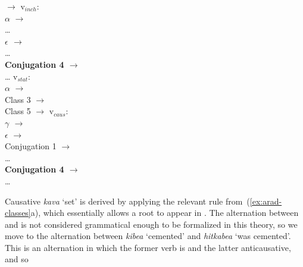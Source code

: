 \begin{exe}
\begin{xlist}
\begin{xlist}
\begin{exe}
\begin{xlist}
\begin{xlist}
\begin{exe}
\begin{xlist}
\begin{xlist}
\begin{exe}
\begin{exe}
\begin{xlist}
\begin{exe}
\begin{exe}
\begin{xlist}
\begin{exe}
\begin{exe}
\begin{exe}
\begin{exe}
\begin{exe}
\begin{xlist}
\begin{exe}
\begin{xlist}
\begin{exe}
\begin{exe}
\begin{xlist}
\begin{exe}
\begin{xlist}
\begin{exe}
\begin{exe}
\begin{exe}
\begin{xlist}
\begin{exe}
\begin{exe}
\begin{exe}
\begin{xlist}
\begin{exe}
\begin{xlist}
\begin{exe}
\begin{xlist}
\begin{exe}
\begin{xlist}
\begin{exe}
\begin{exe}
\begin{exe}
\begin{exe}
\begin{xlist}
\begin{exe}
\begin{xlist}
\begin{exe}
\begin{xlist}
\begin{exe}
\begin{xlist}
\begin{exe}
\begin{xlist}
\begin{exe}
\begin{xlist}
\begin{exe}
\begin{exe}
\begin{exe}
\begin{exe}
\begin{xlist}
\begin{exe}
\begin{xlist}
\begin{exe}
\begin{xlist}
\begin{exe}
\begin{exe}
\begin{xlist}
\begin{exe}
\begin{exe}
\begin{exe}
\begin{exe}
\begin{xlist}
\begin{xlist}
\begin{exe}
\begin{xlist}
\begin{exe}
\begin{exe}
\begin{exe}
\begin{xlist}
\begin{exe}
\begin{exe}
\begin{xlist}
\begin{exe}
\begin{exe}
\begin{exe}
\begin{xlist}
\begin{xlist}
\begin{exe}
\begin{xlist}
\begin{exe}
\begin{exe}
\begin{exe}
\begin{exe}
\begin{xlist}
\begin{exe}
\begin{xlist}
\begin{exe}
\begin{xlist}
\begin{exe}
\begin{exe}
\begin{exe}
\begin{exe}
\begin{exe}
\begin{exe}
\begin{xlist}
\begin{exe}
\begin{xlist}
\begin{exe}
\begin{xlist}
\begin{exe}
\begin{xlist}
\begin{exe}
\begin{xlist}
\begin{exe}
\begin{xlist}
\begin{exe}
\begin{xlist}
\begin{multicols}{2}
$\rightarrow$ {\thit}
 	\ex  v$_{inch}$: \\
			$ \alpha$ $\rightarrow$ {\tkal} \\
			\dots \\
			\textbf{$\epsilon$ $\rightarrow$ {\thit}}\\
			\dots \\
			\textbf{Conjugation 4 $\rightarrow$ {\thit}}\\
			\dots
		\columnbreak
 	\ex  v$_{stat}$: \\
			$ \alpha$ $\rightarrow$ {\tkal} \\
			Class 3 $\rightarrow$ {\tkal}\\
			Class 5 $\rightarrow$ {\tkal}
 	\ex  v$_{caus}$: \\
			\textbf{$\gamma$ $\rightarrow$ {\tpie}}\\
			$\epsilon$ $\rightarrow$ {\thif}\\
			Conjugation 1 $\rightarrow$ {\tkal}\\
			\dots \\
			\textbf{Conjugation 4 $\rightarrow$ {\tpie}}\\
			\dots
	\end{multicols}
 \z
\z 

Causative \emph{kava} `set' is derived by applying the relevant rule from~(\ref{ex:arad-classes}a), which essentially allows a root to appear in {\tkal}. The alternation between {\tkal} and {\tpie} is not considered grammatical enough to be formalized in this theory, so we move to the alternation between \emph{kibea} `cemented' and \emph{hitkabea} `was cemented'. This is an alternation in which the former verb is  and the latter anticausative, and so 
\end{xlist}
\end{exe}
\end{xlist}
\end{exe}
\end{xlist}
\end{exe}
\end{xlist}
\end{exe}
\end{xlist}
\end{exe}
\end{xlist}
\end{exe}
\end{xlist}
\end{exe}
\end{exe}
\end{exe}
\end{exe}
\end{exe}
\end{exe}
\end{xlist}
\end{exe}
\end{xlist}
\end{exe}
\end{xlist}
\end{exe}
\end{exe}
\end{exe}
\end{exe}
\end{xlist}
\end{exe}
\end{xlist}
\end{xlist}
\end{exe}
\end{exe}
\end{exe}
\end{xlist}
\end{exe}
\end{exe}
\end{xlist}
\end{exe}
\end{exe}
\end{exe}
\end{xlist}
\end{exe}
\end{xlist}
\end{xlist}
\end{exe}
\end{exe}
\end{exe}
\end{exe}
\end{xlist}
\end{exe}
\end{exe}
\end{xlist}
\end{exe}
\end{xlist}
\end{exe}
\end{xlist}
\end{exe}
\end{exe}
\end{exe}
\end{exe}
\end{xlist}
\end{exe}
\end{xlist}
\end{exe}
\end{xlist}
\end{exe}
\end{xlist}
\end{exe}
\end{xlist}
\end{exe}
\end{xlist}
\end{exe}
\end{exe}
\end{exe}
\end{exe}
\end{xlist}
\end{exe}
\end{xlist}
\end{exe}
\end{xlist}
\end{exe}
\end{xlist}
\end{exe}
\end{exe}
\end{exe}
\end{xlist}
\end{exe}
\end{exe}
\end{exe}
\end{xlist}
\end{exe}
\end{xlist}
\end{exe}
\end{exe}
\end{xlist}
\end{exe}
\end{xlist}
\end{exe}
\end{exe}
\end{exe}
\end{exe}
\end{exe}
\end{xlist}
\end{exe}
\end{exe}
\end{xlist}
\end{exe}
\end{exe}
\end{xlist}
\end{xlist}
\end{exe}
\end{xlist}
\end{xlist}
\end{exe}
\end{xlist}
\end{xlist}
\end{exe}
